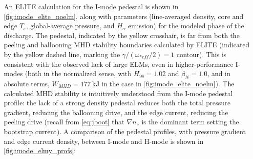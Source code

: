 An ELITE calculation for the I-mode pedestal is shown in \cref{fig:imode_elite_noelm}, along with parameters (line-averaged density, core and edge $T_e$, global-average pressure, and $H_\alpha$ emission) for the modeled phase of the discharge.  The pedestal, indicated by the yellow crosshair, is far from both the peeling and ballooning MHD stability boundaries calculated by ELITE (indicated by the yellow dashed line, marking the $\gamma/(\omega_{*eff}/2) = 1$ contour).  This is consistent with the observed lack of large ELMs, even in higher-performance I-modes (both in the normalized sense, with $H_{98} = 1.02$ and $\beta_N = 1.0$, and in absolute terms, $W_{MHD} = \SI{177}{\kilo\joule}$ in the case in \cref{fig:imode_elite_noelm}).  The calculated MHD stability is intuitively understood from the I-mode pedestal profile: the lack of a strong density pedestal reduces both the total pressure gradient, reducing the ballooning drive, and the edge current, reducing the peeling drive (recall from \cref{eq:jboot} that $\nabla n_e$ is the dominant term setting the bootstrap current).  A comparison of the pedestal profiles, with pressure gradient and edge current density, between I-mode and H-mode is shown in \cref{fig:imode_elmy_profs}:

\begin{figure}[h]
 \pushtooutside
\end{figure}

